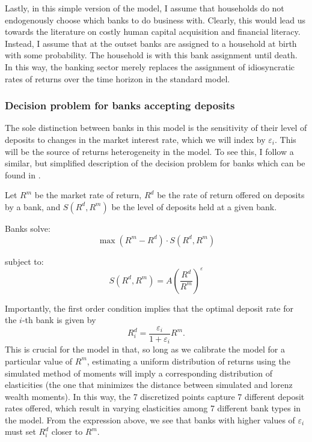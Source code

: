 \par Lastly, in this simple version of the model, I assume that households do not endogenously choose which banks to do business with. Clearly, this would lead us towards the literature on costly human capital acquisition and financial literacy. Instead, I assume that at the outset banks are assigned to a household at birth with some probability. The household is  with this bank assignment until death. In this way, the banking sector merely replaces the assignment of idiosyncratic rates of returns over the time horizon in the standard model. 

\subsubsection{Decision problem for banks accepting deposits}

\par The sole distinction between banks in this model is the sensitivity of their level of deposits to changes in the market interest rate, which we will index by $\varepsilon_i$. This will be the source of returns heterogeneity in the model. To see this, I follow a similar, but simplified description of the decision problem for banks which can be found in \cite{Paul2024}.

 \par Let $R^m$ be the market rate of return, $R^d$ be the rate of return offered on deposits by a  bank, and $S(R^d, R^m)$ be the level of deposits held at a given bank.

\par Banks solve:
\[
\max (R^m - R^d) \cdot S(R^d, R^m)
\]

\par subject to:
\[
S(R^d, R^m) = A \left( \frac{R^d}{R^m} \right)^{\varepsilon}
\]

\par Importantly, the first order condition implies that the optimal deposit rate for the $i$-th bank is given by $$ R_i^d = \frac{\varepsilon_i}{1+\varepsilon_i} R^m.  $$ This is crucial for the model in that, so long as we calibrate the model for a particular value of $R^m$, estimating a uniform distribution of returns using the simulated method of moments will imply a corresponding distribution of elasticities (the one that minimizes the distance between simulated and lorenz wealth moments). In this way, the 7 discretized points capture 7 different deposit rates offered, which result in varying elasticities among 7 different bank types in the model. From the expression above, we see that banks with higher values of $\varepsilon_i$  must set $R_i^d$ closer to $R^m$.

